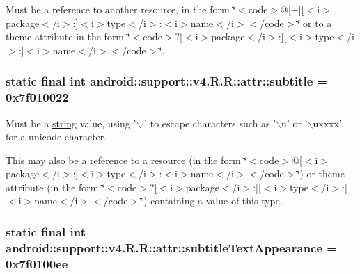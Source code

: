 Must be a reference to another resource, in the form \char`\"{}$<$code$>$@\mbox{[}+\mbox{]}\mbox{[}$<$i$>$package$<$/i$>$:\mbox{]}$<$i$>$type$<$/i$>$:$<$i$>$name$<$/i$>$$<$/code$>$\char`\"{} or to a theme attribute in the form \char`\"{}$<$code$>$?\mbox{[}$<$i$>$package$<$/i$>$:\mbox{]}\mbox{[}$<$i$>$type$<$/i$>$:\mbox{]}$<$i$>$name$<$/i$>$$<$/code$>$\char`\"{}. \hypertarget{classandroid_1_1support_1_1v4_1_1_r_1_1attr_f086325a5b74dd3d871ce41c6c9f0fd0}{
\subsubsection[{subtitle}]{\setlength{\rightskip}{0pt plus 5cm}static final int android::support::v4.R.R::attr::subtitle = 0x7f010022}}
\label{classandroid_1_1support_1_1v4_1_1_r_1_1attr_f086325a5b74dd3d871ce41c6c9f0fd0}


Must be a \hyperlink{classandroid_1_1support_1_1v4_1_1_r_1_1string}{string} value, using '$\backslash$;' to escape characters such as '$\backslash$n' or '$\backslash$uxxxx' for a unicode character. 

This may also be a reference to a resource (in the form \char`\"{}$<$code$>$@\mbox{[}$<$i$>$package$<$/i$>$:\mbox{]}$<$i$>$type$<$/i$>$:$<$i$>$name$<$/i$>$$<$/code$>$\char`\"{}) or theme attribute (in the form \char`\"{}$<$code$>$?\mbox{[}$<$i$>$package$<$/i$>$:\mbox{]}\mbox{[}$<$i$>$type$<$/i$>$:\mbox{]}$<$i$>$name$<$/i$>$$<$/code$>$\char`\"{}) containing a value of this type. \hypertarget{classandroid_1_1support_1_1v4_1_1_r_1_1attr_f56bffec2edff659bd3fb2891171b699}{
\subsubsection[{subtitleTextAppearance}]{\setlength{\rightskip}{0pt plus 5cm}static final int android::support::v4.R.R::attr::subtitleTextAppearance = 0x7f0100ee}}
\label{classandroid_1_1support_1_1v4_1_1_r_1_1attr_f56bffec2edff659bd3fb2891171b699}


